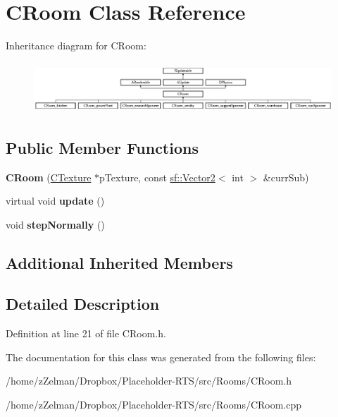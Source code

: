 \hypertarget{classCRoom}{\section{C\-Room Class Reference}
\label{classCRoom}
}
Inheritance diagram for C\-Room\-:\begin{figure}[H]
\begin{center}
\leavevmode
\includegraphics[height=1.904762cm]{classCRoom}
\end{center}
\end{figure}
\subsection*{Public Member Functions}
\begin{DoxyCompactItemize}
\item 
\hypertarget{classCRoom_a238c3071e90bfb973b8b6f8eb9dc44c9}{{\bfseries C\-Room} (\hyperlink{classCTexture}{C\-Texture} $\ast$p\-Texture, const \hyperlink{classsf_1_1Vector2}{sf\-::\-Vector2}$<$ int $>$ \&curr\-Sub)}\label{classCRoom_a238c3071e90bfb973b8b6f8eb9dc44c9}

\item 
\hypertarget{classCRoom_a554288f277403d72aa6eae4139096996}{virtual void {\bfseries update} ()}\label{classCRoom_a554288f277403d72aa6eae4139096996}

\item 
\hypertarget{classCRoom_ada8b3e3ffc799354d377df71e5ee6b7d}{void {\bfseries step\-Normally} ()}\label{classCRoom_ada8b3e3ffc799354d377df71e5ee6b7d}

\end{DoxyCompactItemize}
\subsection*{Additional Inherited Members}


\subsection{Detailed Description}


Definition at line 21 of file C\-Room.\-h.



The documentation for this class was generated from the following files\-:\begin{DoxyCompactItemize}
\item 
/home/z\-Zelman/\-Dropbox/\-Placeholder-\/\-R\-T\-S/src/\-Rooms/C\-Room.\-h\item 
/home/z\-Zelman/\-Dropbox/\-Placeholder-\/\-R\-T\-S/src/\-Rooms/C\-Room.\-cpp\end{DoxyCompactItemize}
